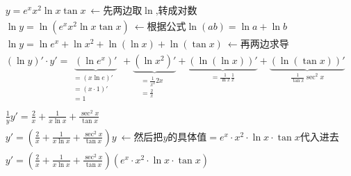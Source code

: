 \documentclass[UTF8]{ctexart}
\newenvironment{myEnvSample}
{ 
	\begin{tcolorbox}[title = {例},boxrule={0.1em},colframe={black!10}, colback={black!3},colbacktitle={black!10},coltitle={black}]
		}
		{		
	\end{tcolorbox}
}
\begin{document}
\begin{myEnvSample}
	\begin{align*}
		&y=e^xx^2\ln x\tan x\ \gets \text{先两边取}\ln\text{,转成对数}\\
	&\ln y=\ln \left( e^xx^2\ln x\tan x \right) \ \gets \text{根据公式}\ln \left( ab \right) =\ln a+\ln b\\
	&\ln y=\ln e^x+\ln x^2+\ln \left( \ln x \right) +\ln \left( \tan x \right) \ \gets \text{再两边求导}\\
	&\left( \ln y \right) '\cdot y'=\underset{\begin{matrix}
			=\left( x\ln e \right) '\\
			=\left( x\cdot 1 \right) '\\
			=1\\
	&\end{matrix}}{\underbrace{\left( \ln e^x \right) '}}+\underset{\begin{matrix}
			=\frac{1}{x^2}2x\\
			=\frac{2}{x}\\
	&\end{matrix}}{\underbrace{\left( \ln x^2 \right) '}}+\underset{=\frac{1}{\ln x}\frac{1}{x}}{\underbrace{\left( \ln \left( \ln x \right) \right) '}}+\underset{\frac{1}{\tan x}\sec ^2x}{\underbrace{\left( \ln \left( \tan x \right) \right) '}}\\
	&\frac{1}{y}y'=\frac{2}{x}+\frac{1}{x\ln x}+\frac{\sec ^2x}{\tan x}\\
	&y'=\left( \frac{2}{x}+\frac{1}{x\ln x}+\frac{\sec ^2x}{\tan x} \right) y\ \gets \text{然后把}y\text{的具体值}=e^x\cdot x^2\cdot \ln x\cdot \tan x\text{代入进去}\\
	&y'=\left( \frac{2}{x}+\frac{1}{x\ln x}+\frac{\sec ^2x}{\tan x} \right) \left( e^x\cdot x^2\cdot \ln x\cdot \tan x \right)	
	\end{align*}
\end{myEnvSample}
\end{document}
